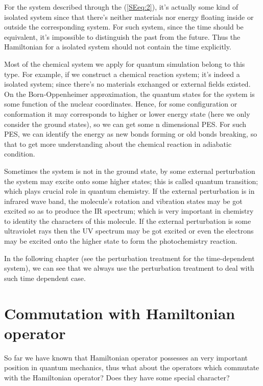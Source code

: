 For the system described through the (\ref{SEeq:2}), it's actually
some kind of isolated system since that there's neither materials
nor energy floating inside or outside the corresponding system. For
such system, since the time should be equivalent, it's impossible to
distinguish the past from the future. Thus the Hamiltonian for a
isolated system should not contain the time explicitly.

Most of the chemical system we apply for quantum simulation belong
to this type. For example, if we construct a chemical reaction
system; it's indeed a isolated system; since there's no materials
exchanged or external fields existed. On the Born-Oppenheimer
approximation, the quantum states for the system is some function of
the nuclear coordinates. Hence, for some configuration or
conformation it may corresponds to higher or lower energy state
(here we only consider the ground states), so we can get some n
dimensional PES. For such PES, we can identify the energy as new
bonds forming or old bonds breaking, so that to get more
understanding about the chemical reaction in adiabatic condition.

Sometimes the system is not in the ground state, by some external
perturbation the system may excite onto some higher states; this is
called quantum transition; which plays crucial role in quantum
chemistry. If the external perturbation is in infrared wave band,
the molecule's rotation and vibration states may be got excited so
as to produce the IR spectrum; which is very important in chemistry
to identity the characters of this molecule. If the external
perturbation is some ultraviolet rays then the UV spectrum may be
got excited or even the electrons may be excited onto the higher
state to form the photochemistry reaction.

In the following chapter (see the perturbation treatment for the
time-dependent system), we can see that we always use the
perturbation treatment to deal with such time dependent case.

\section{Commutation with Hamiltonian operator}\label{SE:3}
%
%

So far we have known that Hamiltonian operator possesses an very
important position in quantum mechanics, thus what about the
operators which commutate with the Hamiltonian operator? Does they
have some special character?

